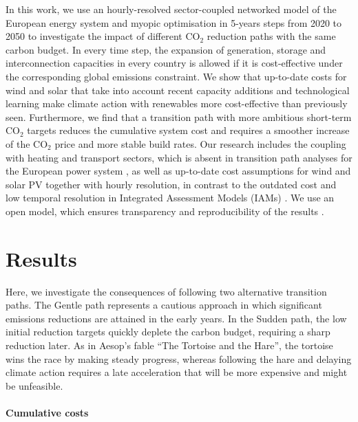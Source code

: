 \documentclass[5p]{elsarticle} %
\begin{document}
In this work, we use an hourly-resolved sector-coupled networked model of the European energy system and myopic optimisation in 5-years steps from 2020 to 2050 to investigate the impact of different CO$_2$ reduction paths with the same carbon budget. In every time step, the expansion of generation, storage and interconnection capacities in every country is allowed if it is cost-effective under the corresponding global emissions constraint. We show that up-to-date costs for wind and solar that take into account recent capacity additions and technological learning make climate action with renewables more cost-effective than previously seen. Furthermore, we find that a transition path with more ambitious short-term CO$_2$ targets reduces the cumulative system cost and requires a smoother increase of the CO$_2$ price and more stable build rates. Our research includes the coupling  with heating and transport sectors, which is absent in transition path analyses for the European power system \cite{Plesmann_2017, Gerbaulet_2019, Poncelet_2016}, as well as up-to-date cost assumptions for wind and solar PV together with hourly resolution, in contrast to the outdated cost and low temporal resolution in Integrated Assessment Models (IAMs) \cite{Creutzig_2017, Krey_2019}. We use an open model, which ensures transparency and reproducibility of the results \cite{Pfenninger_2017}. %


\section{Results}



Here, we investigate the consequences of following two alternative transition paths. The Gentle path represents a cautious approach in which significant emissions reductions are attained in the early years. In the Sudden path, the low initial reduction targets quickly deplete the carbon budget, requiring a sharp reduction later. As in Aesop's fable ``The Tortoise and the Hare'', the tortoise wins the race by making steady progress, whereas following the hare and delaying climate action requires a late acceleration that will be more expensive and might be unfeasible. 

\paragraph{\textbf{Cumulative costs}} \
\end{document}
